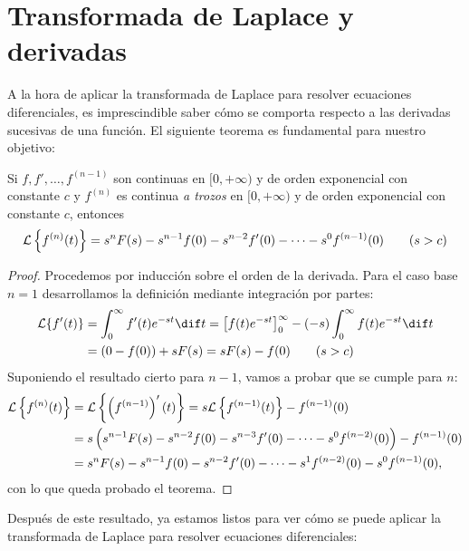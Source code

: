 \documentclass[../main.tex]{subfiles}
\begin{document}
\section{Transformada de Laplace y derivadas}
A la hora de aplicar la transformada de Laplace para resolver ecuaciones
diferenciales, es imprescindible saber cómo se comporta respecto a las derivadas
sucesivas de una función. El siguiente teorema es fundamental para nuestro
objetivo:

\begin{theorem}
  Si \(f, f', \dots, f^{(n-1)}\) son continuas en \([0,+\infty)\) y de orden
  exponencial con constante \(c\) y \(f^{(n)}\) es continua \emph{a trozos} en
  \([0,+\infty)\) y de orden exponencial con constante \(c\), entonces
  \[\mathcal{L}\left\{f^{(n)}(t)\right\} = s^nF(s) - s^{n-1}f(0) - s^{n-2}f'(0) - \cdots -
    s^0f^{(n-1)}(0) \qquad (s>c)\]
  \begin{proof}
    Procedemos por inducción sobre el orden de la derivada. Para el caso base
    \(n=1\) desarrollamos la definición mediante integración por partes:
    \begin{align*}
      \L\{f'(t)\} &= \int_0^\infty f'(t)e^{-st} \dif t =
      \left[f(t)e^{-st}\right]_0^\infty - (-s) \int_0^\infty f(t)e^{-st} \dif t \\
      &= (0-f(0)) + sF(s) = sF(s) - f(0) \qquad (s > c)
    \end{align*}
    Suponiendo el resultado cierto para \(n-1\), vamos a probar que se cumple
    para \(n\):
    \begin{align*}
      \mathcal{L}\left\{f^{(n)}(t)\right\} &= \mathcal{L}\left\{\left(f^{(n-1)}\right)'(t)\right\} =
      s\mathcal{L}\left\{f^{(n-1)}(t)\right\} - f^{(n-1)}(0) \\
      &= s \left( s^{n-1}F(s) - s^{n-2}f(0) - s^{n-3}f'(0) - \cdots -
        s^0f^{(n-2)}(0) \right) - f^{(n-1)}(0) \\
      &= s^nF(s) - s^{n-1}f(0) - s^{n-2}f'(0) - \cdots - s^1f^{(n-2)}(0) - s^0f^{(n-1)}(0),
    \end{align*}
    con lo que queda probado el teorema.
  \end{proof}
\end{theorem}

Después de este resultado, ya estamos listos para ver cómo se puede aplicar la
transformada de Laplace para resolver ecuaciones diferenciales:
\end{document}
